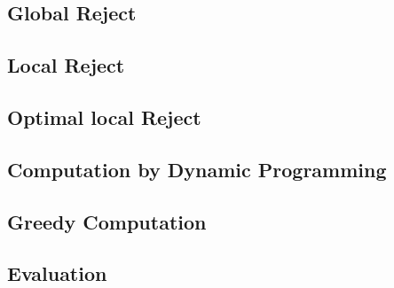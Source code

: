 \subsection{Global Reject}


\subsection{Local Reject}

\subsection{Optimal local Reject}

\subsection{Computation by Dynamic Programming}

\subsection{Greedy Computation}

\subsection{Evaluation}